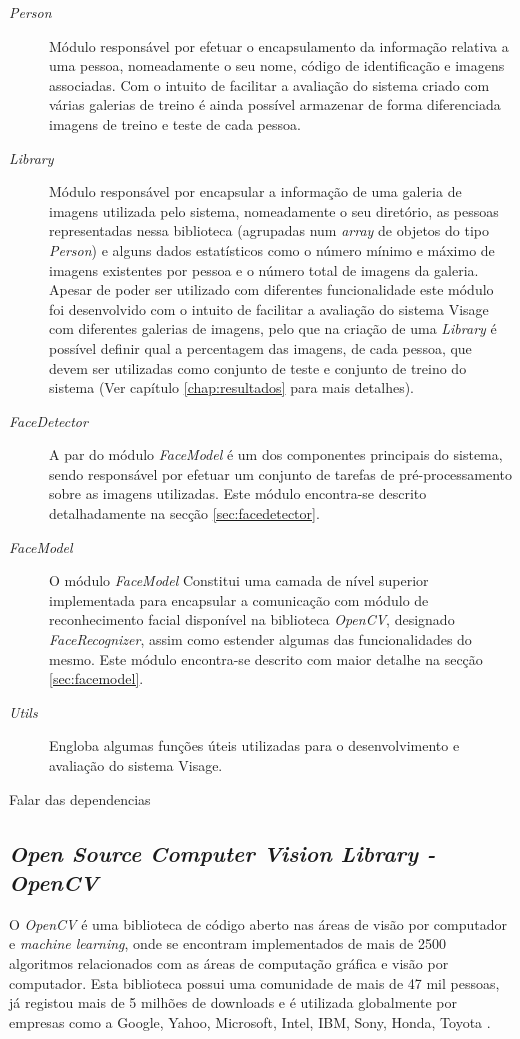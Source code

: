 \begin{description}
\item[\textit{Person}] Módulo responsável por efetuar o encapsulamento da informação relativa a uma pessoa, nomeadamente o seu nome, código de identificação e imagens associadas. Com o intuito de facilitar a avaliação do sistema criado com várias galerias de treino é ainda possível armazenar de forma diferenciada imagens de treino e teste de cada pessoa.
\item[\textit{Library}]Módulo responsável por encapsular a informação de uma galeria de imagens utilizada pelo sistema, nomeadamente o seu diretório, as pessoas representadas nessa biblioteca (agrupadas num \textit{array} de objetos do tipo \textit{Person}) e alguns dados estatísticos como o número mínimo e máximo de imagens existentes por pessoa e o número total de imagens da galeria. Apesar de poder ser utilizado com diferentes funcionalidade este módulo foi desenvolvido com o intuito de facilitar a avaliação do sistema Visage com diferentes galerias de imagens, pelo que na criação de uma \textit{Library} é possível definir qual a percentagem das imagens, de cada pessoa, que devem ser utilizadas como conjunto de teste e conjunto de treino do sistema (Ver capítulo \ref{chap:resultados} para mais detalhes).
\item[\textit{FaceDetector}] A par do módulo \textit{FaceModel} é um dos componentes principais do sistema, sendo responsável por efetuar um conjunto de tarefas de pré-processamento sobre as imagens utilizadas. Este módulo encontra-se descrito detalhadamente na secção \ref{sec:facedetector}.
\item[\textit{FaceModel}] 
O módulo \textit{FaceModel} Constitui uma camada de nível superior implementada para encapsular a comunicação com módulo de reconhecimento facial disponível na biblioteca \textit{OpenCV}, designado \textit{FaceRecognizer}, assim como estender algumas das funcionalidades do mesmo. Este módulo encontra-se descrito com maior detalhe na secção \ref{sec:facemodel}.
\item[\textit{Utils}] Engloba algumas funções úteis utilizadas para o desenvolvimento e avaliação do sistema Visage.
\end{description}

Falar das dependencias

\subsection*{\textit{Open Source Computer Vision Library - OpenCV}}
O \textit{OpenCV} é uma biblioteca de código aberto nas áreas de visão por computador e \textit{machine learning}, onde se encontram implementados de mais de 2500 algoritmos relacionados com as áreas de computação gráfica e visão por computador. Esta biblioteca possui uma comunidade de mais de 47 mil pessoas, já registou mais de 5 milhões de downloads e é utilizada globalmente por empresas como a Google, Yahoo, Microsoft, Intel, IBM, Sony, Honda, Toyota \cite{Team}. 

